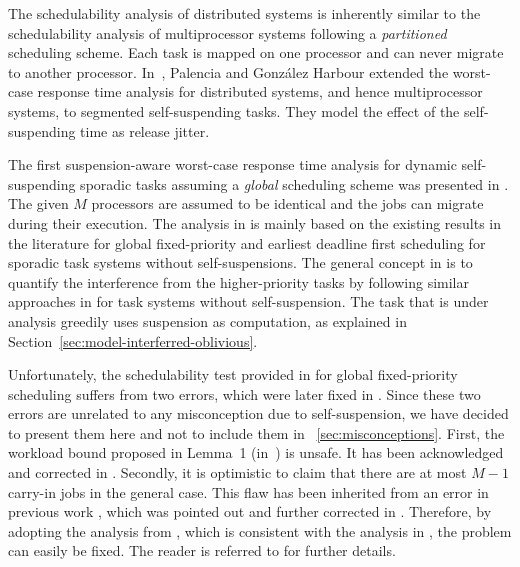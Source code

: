 The schedulability analysis of distributed systems is inherently similar to the schedulability analysis of multiprocessor systems following a 
\emph{partitioned} scheduling scheme. Each task is mapped on one processor and can never migrate to another processor. In~\cite{PH:rtss98}, 
Palencia and Gonz\'alez Harbour extended the worst-case response time analysis for distributed systems, and hence multiprocessor systems, to segmented self-suspending tasks. They model the effect of the self-suspending time as release jitter.
  
The first suspension-aware worst-case response time analysis for dynamic self-suspending sporadic tasks assuming a \emph{global} scheduling scheme was presented in \cite{DBLP:conf/ecrts/LiuA13}. 
The given $M$ processors are assumed to be identical and the jobs can migrate during their execution. The analysis in \cite{DBLP:conf/ecrts/LiuA13} is mainly based on the existing results in the literature for global fixed-priority and earliest deadline first scheduling for sporadic task systems without self-suspensions. The general concept in \cite{DBLP:conf/ecrts/LiuA13} is to quantify the interference from the higher-priority tasks by following similar approaches 
in \cite{baruah2007techniques,DBLP:conf/rtss/GuanSYY09} for task systems without self-suspension. The task that is under analysis greedily uses suspension as computation, as explained in Section~\ref{sec:model-interferred-oblivious}. 

Unfortunately, the schedulability test provided in \cite{DBLP:conf/ecrts/LiuA13} for global fixed-priority scheduling suffers from two errors, which were later fixed in \cite{erratu-cong-anderson}.  Since these two errors are unrelated to any misconception due to self-suspension, we have decided to present them here and not to include them in \mysectionref{}~\ref{sec:misconceptions}.
 First, the workload bound proposed in Lemma~1 (in~\cite{DBLP:conf/ecrts/LiuA13}) is unsafe. It has been acknowledged and corrected in \cite{erratu-cong-anderson}. 
Secondly, it is optimistic to claim that there are at most $M-1$ carry-in jobs in the general case. This flaw has been inherited from an error in  
previous work \cite{DBLP:conf/rtss/GuanSYY09}, which was pointed out and further corrected in \cite{sun2014improving,DBLP:conf/rtns/HuangC15}.  Therefore, by adopting the analysis from \cite{DBLP:conf/rtns/HuangC15}, which is consistent with the analysis in \cite{DBLP:conf/ecrts/LiuA13}, the problem can easily be fixed. The reader is referred to \cite{erratu-cong-anderson} for further details.
 
